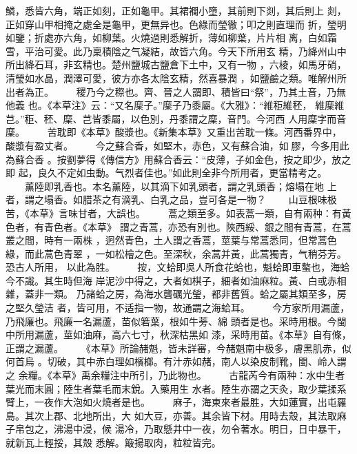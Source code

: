 \documentclass{ctexart}
\begin{document}
鱗，悉皆六角，端正如刻，正如龜甲。其裙襴小墮，其前則下剡，其后則上 剡，正如穿山甲相掩之處全是龜甲，更無异也。色綠而瑩徹；叩之則直理而 折，瑩明如鑒；折處亦六角，如柳葉。火燒過則悉解折，薄如柳葉，片片相 离，白如霜雪，平治可愛。此乃稟積陰之气凝結，故皆六角。今天下所用玄 精，乃絳州山中所出絳石耳，非玄精也。楚州鹽城古鹽倉下土中，又有一物 ，六棱，如馬牙硝，清瑩如水晶，潤澤可愛，彼方亦各太陰玄精，然喜暴潤 ，如鹽鹼之類。唯解州所出者為正。 　　稷乃今之穄也。齊、晉之人謂即、積皆曰``祭''，乃其土音，乃無他義 也。《本草注》云：``又名穈子。''穈子乃黍屬。《大雅》：``維秬維秠， 維穈維芑。''秬、秠、穈、芑皆黍屬，以色別，丹黍謂之穈，音門。今河西 人用穈字而音穈。 　　苦耽即《本草》酸漿也。《新集本草》又重出苦耽一條。河西番界中， 酸漿有盈丈者。 　　今之蘇合香，如堅木，赤色，又有蘇合油，如膠，今多用此為蘇合香 。按劉夢得《傳信方》用蘇合香云：``皮薄，子如金色，按之即少，放之即 起，良久不定如虫動。气烈者佳也。''如此則全非今所用者，更當精考之。 　　薰陸即乳香也。本名薰陸，以其滴下如乳頭者，謂之乳頭香；熔塌在地 上者，謂之塌香。如腊茶之有滴乳、白乳之品，豈可各是一物？ 　　山豆根味极苦，《本草》言味甘者，大誤也。 　　蒿之類至多。如表蒿一類，自有兩种：有黃色者，有青色者。《本草》 謂之青蒿，亦恐有別也。陝西綏、銀之間有青蒿，在蒿叢之間，時有一兩株 ，迥然青色，土人謂之香蒿，莖葉与常蒿悉同，但常蒿色綠，而此蒿色青翠 ，一如松檜之色。至深秋，余蒿并黃，此蒿獨青，气稍芬芳。恐古人所用， 以此為胜。 　　按，文蛤即吳人所食花蛤也，魁蛤即車螯也，海蛤今不識。其生時但海 岸泥沙中得之，大者如棋子，細者如油麻粒。黃、白或赤相雜，蓋非一類。 乃諸蛤之房，為海水礱礪光瑩，都非舊質。蛤之屬其類至多，房之堅久瑩洁 者，皆可用，不适指一物，故通謂之海蛤耳。 　　今方家所用漏蘆，乃飛廉也。飛廉一名漏蘆，苗似箬葉，根如牛蒡、綿 頭者是也。采時用根。今閩中所用漏蘆，莖如油麻，高六七寸，秋深枯黑如 漆，采時用苗。《本草》自有條，正謂之漏蘆。 　　《本草》所論赭魁，皆未詳審，今赭魁南中极多，膚黑肌赤，似何首烏 。切破，其中赤白理如檳榔。有汁赤如赭，南人以染皮制靴，閩、岭人謂之 余糧。《本草》禹余糧注中所引，乃此物也。 　　古龍芮今有兩种：水中生者葉光而末圓；陸生者葉毛而末銳。入藥用生 水者。陸生亦謂之天灸，取少葉揉系臂上，一夜作大泡如火燒者是也。 　　麻子，海東來者最胜，大如蓮實，出屯羅島。其次上郡、北地所出，大 如大豆，亦善。其余皆下材。用時去殼，其法取麻子帛包之，沸湯中浸，候 湯冷，乃取懸井中一夜，勿令著水。明日，日中暴干，就新瓦上輕挼，其殼 悉解。簸揚取肉，粒粒皆完。
\end{document}

